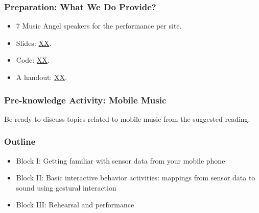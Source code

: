\documentclass[screen, aspectratio=43]{beamer}
\begin{document}
%
\begin{frame}
  \frametitle{Preparation: What We Do Provide?}
        \begin{itemize}
        \item 7 Music Angel speakers for the performance per site.
        \item Slides: \url{XX}.
        \item Code: \url{XX}.
        \item A handout: \url{XX}.        
         \end{itemize}
\end{frame}
%
\begin{frame}
  \frametitle{Pre-knowledge Activity: Mobile Music}
  Be ready to discuss topics related to mobile music from the suggested reading.
\end{frame}
%
\begin{frame}
  \frametitle{Outline}
      \begin{itemize}
	\item Block I: Getting familiar with sensor data from your mobile phone
	\item Block II: Basic interactive behavior activities: mappings from sensor data to sound using gestural interaction
	\item Block III: Rehearsal and performance
    \end{itemize}  
\end{frame}
%
\end{document}
